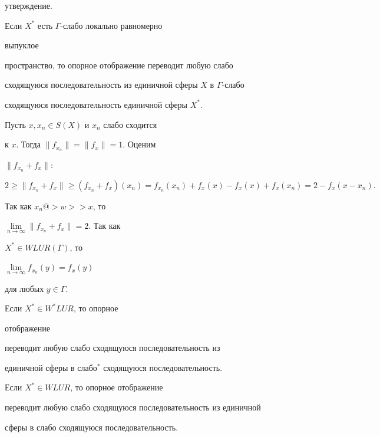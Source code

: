 утверждение. 


 


\begin{thm} Если $X^*$ есть $\Gamma$-слабо локально равномерно 


выпуклое 


пространство, то опорное отображение переводит любую слабо 


сходящуюся последовательность из единичной сферы $X$ в $\Gamma$-слабо  


сходящуюся последовательность единичной сферы $X^*$. 


\end{thm} 


 


\begin{pf} Пусть $x,x_n\in S(X)$ и $x_n$ слабо сходится 


к $x$. Тогда $\|f_{x_n}\|=\|f_x\|=1$. Оценим 


$\|f_{x_n}+f_x\|$: 


$$ 


2\ge \|f_{x_n}+f_x\|\ge (f_{x_n}+f_x)(x_n)= 


f_{x_n}(x_n)+f_x(x)-f_x(x)+f_x(x_n)=2-f_x(x-x_n). 


$$ 


Так как $x_n@>{w}>> x$, то 


$\lim\limits_{n\to\infty}\|f_{x_n}+f_x\|=2$. Так как 


$X^*\in WLUR(\Gamma)$, то 


$\lim\limits_{n\to\infty}f_{x_n}(y)=f_x(y)$ 


для любых $y\in\Gamma$. 


\end{pf} 


\setcounter{cor}{0} 


 


\begin{cor}[{\myfont{}[1]}] Если $X^*\in W^*LUR$, то опорное 


отображение 


переводит любую слабо сходящуюся последовательность из 


единичной сферы в слабо${}^*$ сходящуюся последовательность. 


\end{cor} 


 


\begin{cor} Если $X^*\in WLUR$, то опорное отображение 


переводит любую слабо сходящуюся последовательность из единичной 


сферы в слабо сходящуюся последовательность. 


\end{cor} 


